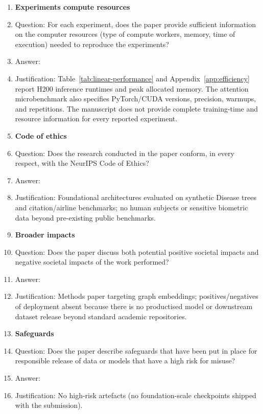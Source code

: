 \begin{enumerate}
\item {\bf Experiments compute resources}
    \item[] Question: For each experiment, does the paper provide sufficient information on the computer resources (type of compute workers, memory, time of execution) needed to reproduce the experiments?
    \item[] Answer: \answerYes{}
    \item[] Justification: Table~\ref{tab:linear-performance} and Appendix~\ref{app:efficiency}
    report H200 inference runtimes and peak allocated memory. The attention
    microbenchmark also specifies PyTorch/CUDA versions, precision, warmups,
    and repetitions. The manuscript does not provide complete training-time
    and resource information for every reported experiment.

\item {\bf Code of ethics}
    \item[] Question: Does the research conducted in the paper conform, in every respect, with the NeurIPS Code of Ethics?
    \item[] Answer: \answerYes{}
    \item[] Justification: Foundational architectures evaluated on synthetic Disease trees and citation/airline benchmarks; no human subjects or sensitive biometric data beyond pre-existing public benchmarks.

\item {\bf Broader impacts}
    \item[] Question: Does the paper discuss both potential positive societal impacts and negative societal impacts of the work performed?
    \item[] Answer: \answerNA{}
    \item[] Justification: Methods paper targeting graph embeddings; positives/negatives of deployment absent because there is no productised model or downstream dataset release beyond standard academic repositories.

\item {\bf Safeguards}
    \item[] Question: Does the paper describe safeguards that have been put in place for responsible release of data or models that have a high risk for misuse?
    \item[] Answer: \answerNA{}
    \item[] Justification: No high-risk artefacts (no foundation-scale checkpoints shipped with the submission).


\end{enumerate}
